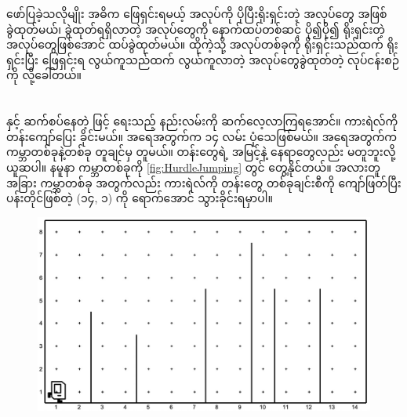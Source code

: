 \begin{sloppypar}
ဖော်ပြခဲ့သလိုမျိုး အဓိက ဖြေရှင်းရမယ့် အလုပ်ကို ပိုပြီးရိုးရှင်းတဲ့ အလုပ်တွေ အဖြစ် ခွဲထုတ်မယ်၊ ခွဲထုတ်ရရှိလာတဲ့ အလုပ်တွေကို နောက်ထပ်တစ်ဆင့် ပို၍ပို၍ ရိုးရှင်းတဲ့ အလုပ်တွေဖြစ်အောင် ထပ်ခွဲထုတ်မယ်။ ထိုကဲ့သို့ အလုပ်တစ်ခုကို ရိုးရှင်းသည်ထက် ရိုးရှင်းပြီး ဖြေရှင်းရ လွယ်ကူသည်ထက် လွယ်ကူလာတဲ့ အလုပ်တွေခွဲထုတ်တဲ့ လုပ်ငန်းစဉ်ကို \enProblemDecomposition လို့ခေါ်တယ်။

\section{}

\enProblemDecomposition နှင့် ဆက်စပ်နေတဲ့  ဖြင့် \mmprogram ရေးသည့် နည်းလမ်းကို ဆက်လေ့လာကြရအောင်။ ကားရဲလ်ကို တန်းကျော်ပြေး ခိုင်းမယ်။ \mmavenue အရေအတွက်က ၁၄ လမ်း ပုံသေဖြစ်မယ်။ \mmstreet အရေအတွက်က ကမ္ဘာတစ်ခုနဲ့တစ်ခု တူချင်မှ တူမယ်။ တန်းတွေရဲ့ အမြင့်နဲ့ နေရာတွေလည်း မတူဘူးလို့ ယူဆပါ။ နမူနာ ကမ္ဘာတစ်ခုကို \Fig \vref*{fig:HurdleJumping} တွင် တွေ့နိုင်တယ်။ အလားတူ အခြား ကမ္ဘာတစ်ခု အတွက်လည်း ကားရဲလ်ကို တန်းတွေ တစ်ခုချင်းစီကို ကျော်ဖြတ်ပြီး ပန်းတိုင်ဖြစ်တဲ့ (၁၄, ၁) \mmcorner ကို ရောက်အောင် သွားခိုင်းရမှာပါ။ 

\begin{figure}[h]
  \caption{}\label{fig:HurdleJumping}
  \includegraphics[width=4.5in, left]{ch03/HurdleJumping/init_w1.jpg}
\end{figure}



\end{sloppypar}
